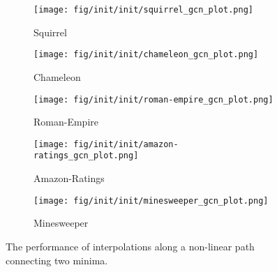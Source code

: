 \begin{figure*}[!ht]
    \begin{subfigure}[b]{0.24\textwidth}
        \texttt{[image: fig/init/init/squirrel\_gcn\_plot.png]}
        \caption{Squirrel}
    \end{subfigure}
    \begin{subfigure}[b]{0.24\textwidth}
        \texttt{[image: fig/init/init/chameleon\_gcn\_plot.png]}
        \caption{Chameleon}
    \end{subfigure}
    \begin{subfigure}[b]{0.24\textwidth}
        \texttt{[image: fig/init/init/roman-empire\_gcn\_plot.png]}
        \caption{Roman-Empire}
    \end{subfigure}
    \begin{subfigure}[b]{0.24\textwidth}
        \texttt{[image: fig/init/init/amazon-ratings\_gcn\_plot.png]}
        \caption{Amazon-Ratings }
    \end{subfigure}
        \begin{subfigure}[b]{0.24\textwidth}
        \texttt{[image: fig/init/init/minesweeper\_gcn\_plot.png]}
        \caption{Minesweeper}
    \end{subfigure}
    \caption{The performance of interpolations along a non-linear path connecting two minima.}
    \label{fig:A1}
\end{figure*}

\clearpage



